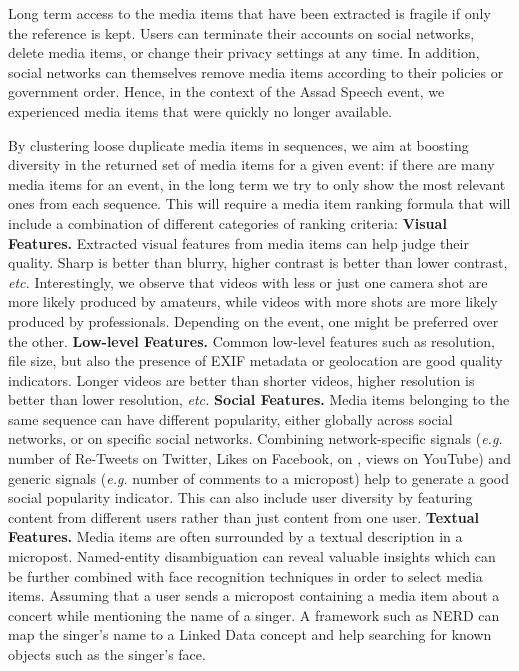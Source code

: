 Long term access to the media items that have been extracted is fragile if only the reference is kept. Users can terminate their accounts on social networks,
delete media items, or change their privacy settings at any time. In addition, social networks can themselves remove media items according to their policies or government order. Hence, in the context of the Assad Speech event, we experienced media items that were quickly no longer available.

By clustering loose duplicate media items in sequences, we aim at boosting diversity in the returned set of media items for a given event: if there are many media items for an event, in the long term we try to only show the most relevant ones from each sequence. This will require a media item ranking formula that will include a combination of different categories of ranking criteria:
\newline
\textbf{Visual Features.} Extracted visual features from media items can help judge their quality. Sharp is better than blurry, higher contrast is better than lower contrast, \emph{etc.} Interestingly, we observe that videos with less or just one camera shot are more likely produced by amateurs, while videos with more shots are more likely produced by professionals. Depending on the event, one might be preferred over the other.
\newline
\textbf{Low-level Features.} Common low-level features such as resolution, file size, but also the presence of EXIF metadata or geolocation are good quality indicators. Longer videos are better than shorter videos, higher resolution is better than lower resolution, \emph{etc.}
\newline
\textbf{Social Features.} Media items belonging to the same sequence can have different popularity, either globally across social networks, or on specific social networks. Combining network-specific signals (\emph{e.g.} number of Re-Tweets on Twitter, Likes on Facebook, \plusone on \googleplus, views on YouTube) and generic signals (\emph{e.g.} number of comments to a micropost) help to generate a good social popularity indicator. This can also include user diversity by featuring content from different users rather than just content from one user.
\newline
\textbf{Textual Features.} Media items are often surrounded by a textual description in a micropost. Named-entity disambiguation can reveal valuable insights which can be further combined with face recognition techniques in order to select media items. Assuming that a user sends a micropost containing a media item about a concert while mentioning the name of a singer. A framework such as NERD can map the singer's name to a Linked Data concept and help searching for known objects such as the singer's face.

